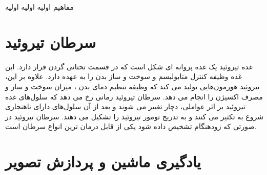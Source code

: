 مفاهیم اولیه اولیه اولیه

\section{سرطان تیروئید}\label{sec:سرطان-تیروئید}
غده تیروئید یک غده پروانه ای شکل است که در قسمت تحتانی گردن قرار دارد.
این غده وظیفه کنترل متابولیسم و سوخت و ساز بدن را به عهده دارد.
علاوه بر این، تیروئید هورمون‌هایی تولید می کند که وظیفه تنظیم دمای بدن ، میزان سوخت و ساز و مصرف اکسیژن را انجام می دهد.
سرطان تیروئید زمانی رخ می دهد که سلول‌های غده تیروئید بر اثر عواملی،  دچار تغییر می شوند و بعد از آن سلول‌های دارای ناهنجاری شروع به تکثیر می کنند و به تدریج تومور تیروئید را تشکیل می دهند.
سرطان تیروئید در صورتی که زودهنگام تشخیص داده شود یکی از قابل درمان ترین انواع سرطان است.







\section{یادگیری ماشین و پردازش تصویر}\label{sec:یادگیری-ماشین-و-پردازش-تصویر}
